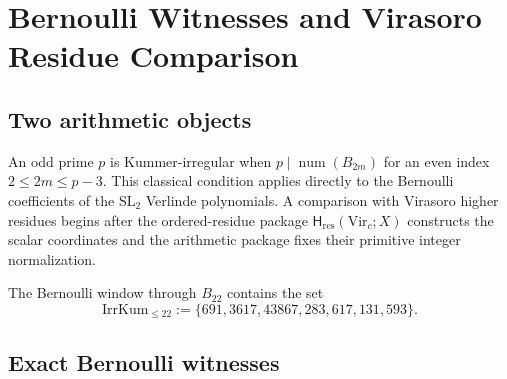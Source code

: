 %

\providecommand{\Vir}{\mathrm{Vir}}
\providecommand{\ClaimStatusDefinitional}{}
\providecommand{\ClaimStatusProvedHere}{}
\providecommand{\ClaimStatusOpen}{}

\chapter{Bernoulli Witnesses and Virasoro Residue Comparison}
\label{ch:higher-kummer-arithmetic-duality}

\section*{Two arithmetic objects}

An odd prime \(p\) is Kummer-irregular when
\(p\mid\operatorname{num}(B_{2m})\) for an even index
\(2\le2m\le p-3\).  This classical condition applies directly to
the Bernoulli coefficients of the \(\mathrm{SL}_2\) Verlinde
polynomials.  A comparison with Virasoro higher residues begins after
the ordered-residue package
\(\mathsf H_{\mathrm{res}}(\Vir_c;X)\) constructs the scalar
coordinates and the arithmetic package fixes their primitive integer
normalization.

The Bernoulli window through \(B_{22}\) contains the set
\begin{equation}
 \mathrm{IrrKum}_{\le22}
 :=\{691,3617,43867,283,617,131,593\}.
 \label{eq:higher-irrkum-tower}
\end{equation}

\section{Exact Bernoulli witnesses}

